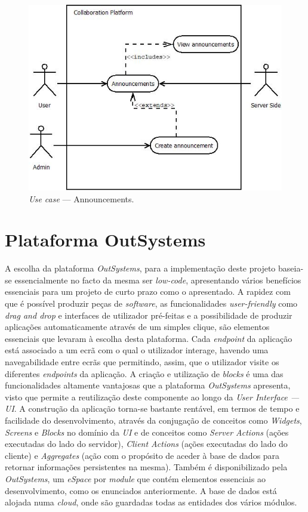 \begin{figure}[H]
    \centering
    \includegraphics[scale=0.6]{figures/Announcements use case.jpeg}
    \caption{\textit{Use case} --- Announcements.}\label{fig:uc:announcements}
\end{figure}

\section{Plataforma OutSystems}\label{sec:plataformaOutSystems}

A escolha da plataforma \textit{OutSystems}, para a implementação deste projeto baseia-se essencialmente no facto da mesma ser \textit{low-code},
apresentando vários benefícios essenciais para um projeto de curto prazo como o apresentado. A rapidez
com que é possível produzir peças de \textit{software}, as funcionalidades \textit{user-friendly} como \textit{drag and drop} e 
interfaces de utilizador pré-feitas e a possibilidade de produzir aplicações automaticamente através de
um simples clique, são elementos essenciais que levaram à escolha desta plataforma. 
Cada \textit{endpoint} da aplicação está associado a um ecrã com o qual o utilizador interage, havendo uma navegabilidade entre ecrãs que permitindo, assim,
 que o utilizador visite os diferentes \textit{endpoints} da aplicação.
A criação e utilização de \textit{blocks} é uma das funcionalidades altamente vantajosas que a plataforma \textit{OutSystems} apresenta, 
visto que permite a reutilização deste componente ao longo da \textit{User Interface --- UI}.
A construção da aplicação torna-se bastante rentável, em termos de tempo e facilidade do desenvolvimento, 
através da conjugação de conceitos como \textit{Widgets}, \textit{Screens} e \textit{Blocks} no domínio da  \textit{UI} 
e de conceitos como \textit{Server Actions} (ações executadas do lado do servidor), \textit{Client Actions} (ações executadas do lado do cliente) 
e \textit{Aggregates} (ação com o propósito de aceder à base de dados para retornar informações persistentes na mesma).
Também é disponibilizado pela \textit{OutSystems}, um \textit{eSpace} por \textit{module} que contém elementos essenciais 
ao desenvolvimento, como os enunciados anteriormente.
A base de dados está alojada numa \textit{cloud}, onde são guardadas todas as entidades dos vários módulos.
